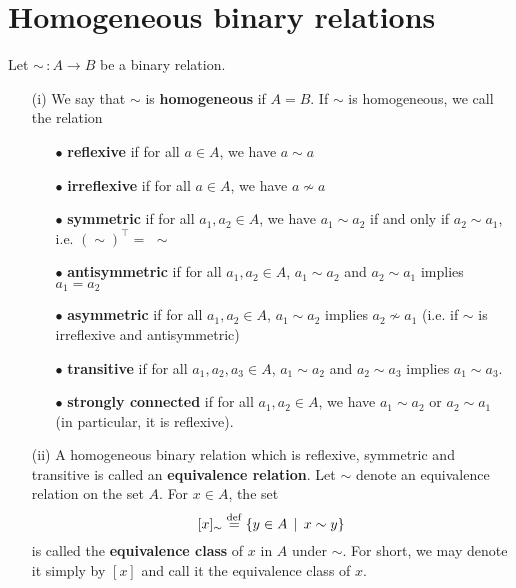 \section{Homogeneous binary relations} \label{homogeneous-relations}

\begin{definition}
	Let $\sim \, : A \to B$ be a binary relation. 
    \begin{itemize}
        \item[(i)] We say that $\sim$ is \textbf{homogeneous} if $A = B$. If $\sim$ is homogeneous, we call the relation
            \begin{itemize}
                \item[$\bullet$] \textbf{reflexive} if for all $a \in A$, we have $a \sim a$
                \item[$\bullet$] \textbf{irreflexive} if for all $a \in A$, we have $a \not\sim a$
                \item[$\bullet$] \textbf{symmetric} if for all $a_1,a_2 \in A$, we have $a_1 \sim a_2$ if and only if $a_2 \sim a_1$, i.e. $(\sim)^{\top} = \,\, \sim$
                \item[$\bullet$] \textbf{antisymmetric} if for all $a_1,a_2 \in A$, $a_1 \sim a_2$ and $a_2 \sim a_1$ implies $a_1 = a_2$
                \item[$\bullet$] \textbf{asymmetric} if for all $a_1,a_2 \in A$, $a_1 \sim a_2$ implies $a_2 \not\sim a_1$ (i.e. if $\sim$ is irreflexive and antisymmetric)
                \item[$\bullet$] \textbf{transitive} if for all $a_1,a_2,a_3 \in A$, $a_1 \sim a_2$ and $a_2 \sim a_3$ implies $a_1 \sim a_3$.
                \\
                \item[$\bullet$] \textbf{strongly connected} if for all $a_1,a_2 \in A$, we have $a_1 \sim a_2$ or $a_2 \sim a_1$ (in particular, it is reflexive).
                \\
            \end{itemize}

        \item[(ii)] A homogeneous binary relation which is reflexive, symmetric and transitive is called an \textbf{equivalence relation}. Let $\sim$ denote an equivalence relation on the set $A$. For $x \in A$, the set
        \[
                [x]_{\sim} \overset{\mathrm{def}}{=} \{ y \in A \, \mid \, x \sim y \}
        \]
        is called the \textbf{equivalence class} of $x$ in $A$ under $\sim$. For short, we may denote it simply by $[x]$ and call it the equivalence class of $x$.
        \\
        

\end{itemize}
\end{definition}
